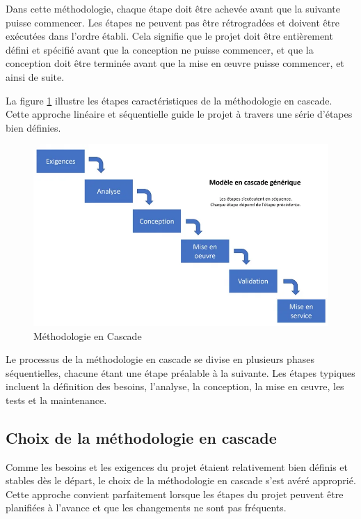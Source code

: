 Dans cette méthodologie, chaque étape doit être achevée avant que la suivante puisse commencer. Les étapes ne peuvent pas être rétrogradées et doivent être exécutées dans l'ordre établi. Cela signifie que le projet doit être entièrement défini et spécifié avant que la conception ne puisse commencer, et que la conception doit être terminée avant que la mise en œuvre puisse commencer, et ainsi de suite.


La figure \ref{Chap1.4} illustre les étapes caractéristiques de la méthodologie en cascade. Cette approche linéaire  et séquentielle guide le projet à travers une série d'étapes bien définies.


\begin{figure}[H]
 \centering
    \includegraphics[width=15cm]{Images/cascade1.png}
    \caption{Méthodologie en Cascade \cite{blogcascade}}
    \label{Chap1.4}
\end{figure}

Le processus de la méthodologie en cascade se divise en plusieurs phases séquentielles, chacune étant une étape préalable à la suivante. Les étapes typiques incluent la définition des besoins, l'analyse, la conception, la mise en œuvre, les tests et la maintenance.



\subsection{Choix de la méthodologie en cascade}

Comme les besoins et les exigences du projet étaient relativement bien définis et stables dès le départ, le choix de la méthodologie en cascade s'est avéré approprié. Cette approche convient parfaitement lorsque les étapes du projet peuvent être planifiées à l'avance et que les changements ne sont pas fréquents.


